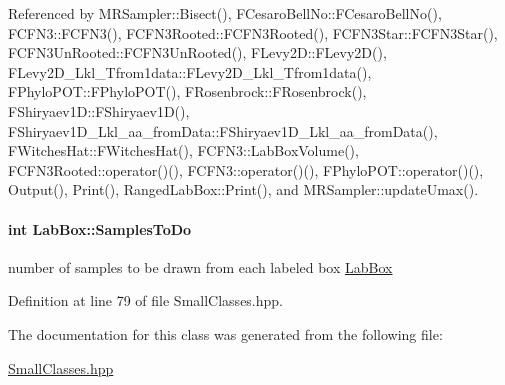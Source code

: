 \-Referenced by \-M\-R\-Sampler\-::\-Bisect(), \-F\-Cesaro\-Bell\-No\-::\-F\-Cesaro\-Bell\-No(), \-F\-C\-F\-N3\-::\-F\-C\-F\-N3(), \-F\-C\-F\-N3\-Rooted\-::\-F\-C\-F\-N3\-Rooted(), \-F\-C\-F\-N3\-Star\-::\-F\-C\-F\-N3\-Star(), \-F\-C\-F\-N3\-Un\-Rooted\-::\-F\-C\-F\-N3\-Un\-Rooted(), \-F\-Levy2\-D\-::\-F\-Levy2\-D(), \-F\-Levy2\-D\-\_\-\-Lkl\-\_\-\-Tfrom1data\-::\-F\-Levy2\-D\-\_\-\-Lkl\-\_\-\-Tfrom1data(), \-F\-Phylo\-P\-O\-T\-::\-F\-Phylo\-P\-O\-T(), \-F\-Rosenbrock\-::\-F\-Rosenbrock(), \-F\-Shiryaev1\-D\-::\-F\-Shiryaev1\-D(), \-F\-Shiryaev1\-D\-\_\-\-Lkl\-\_\-aa\-\_\-from\-Data\-::\-F\-Shiryaev1\-D\-\_\-\-Lkl\-\_\-aa\-\_\-from\-Data(), \-F\-Witches\-Hat\-::\-F\-Witches\-Hat(), \-F\-C\-F\-N3\-::\-Lab\-Box\-Volume(), \-F\-C\-F\-N3\-Rooted\-::operator()(), \-F\-C\-F\-N3\-::operator()(), \-F\-Phylo\-P\-O\-T\-::operator()(), \-Output(), \-Print(), \-Ranged\-Lab\-Box\-::\-Print(), and \-M\-R\-Sampler\-::update\-Umax().

\hypertarget{classLabBox_a54c51c9c9300c28e166fac122b2bd9a9}{
\paragraph[{\-Samples\-To\-Do}]{\setlength{\rightskip}{0pt plus 5cm}int {\bf \-Lab\-Box\-::\-Samples\-To\-Do}}}\label{classLabBox_a54c51c9c9300c28e166fac122b2bd9a9}


number of samples to be drawn from each labeled box \hyperlink{classLabBox}{\-Lab\-Box} 



\-Definition at line 79 of file \-Small\-Classes.\-hpp.



\-The documentation for this class was generated from the following file\-:\begin{DoxyCompactItemize}
\item 
\hyperlink{SmallClasses_8hpp}{\-Small\-Classes.\-hpp}\end{DoxyCompactItemize}
